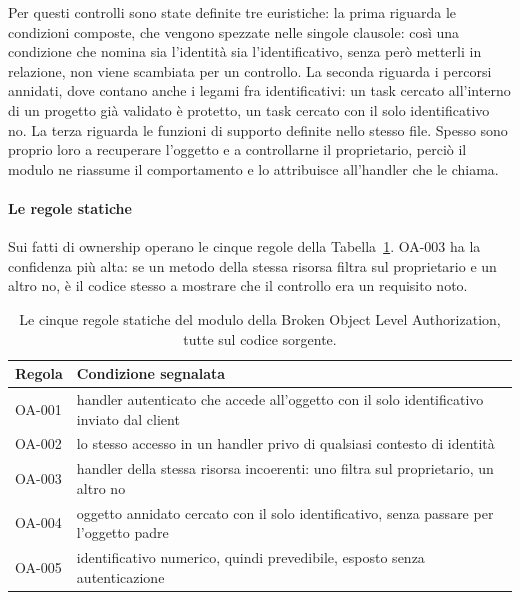 Per questi controlli sono state definite tre euristiche: la prima riguarda le
condizioni composte, che vengono spezzate nelle singole clausole: così una
condizione che nomina sia l'identità sia l'identificativo, senza però metterli
in relazione, non viene scambiata per un controllo. La seconda riguarda i
percorsi annidati, dove contano anche i legami fra identificativi: un task
cercato all'interno di un progetto già validato è protetto, un task cercato con
il solo identificativo no. La terza riguarda le funzioni di supporto definite
nello stesso file. Spesso sono proprio loro a recuperare l'oggetto e a
controllarne il proprietario, perciò il modulo ne riassume il comportamento e
lo attribuisce all'handler che le chiama.

\paragraph{Le regole statiche}
Sui fatti di ownership operano le cinque regole della
Tabella~\ref{tab:regole-bola}. OA-003 ha la confidenza più alta: se un metodo
della stessa risorsa filtra sul proprietario e un altro no, è il codice stesso
a mostrare che il controllo era un requisito noto.

\begin{table}[htbp]
  \centering
  \small
  \linespread{1.0}\selectfont
  \begin{tabularx}{\linewidth}{@{}l X@{}}
    \toprule
    \textbf{Regola} & \textbf{Condizione segnalata} \\
    \midrule
    OA-001 & handler autenticato che accede all'oggetto con il solo
    identificativo inviato dal client \\
    OA-002 & lo stesso accesso in un handler privo di qualsiasi contesto di
    identità \\
    OA-003 & handler della stessa risorsa incoerenti: uno filtra sul
    proprietario, un altro no \\
    OA-004 & oggetto annidato cercato con il solo identificativo, senza
    passare per l'oggetto padre \\
    OA-005 & identificativo numerico, quindi prevedibile, esposto senza
    autenticazione \\
    \bottomrule
  \end{tabularx}
  \caption[Regole statiche della BOLA]{Le cinque regole statiche del modulo
  della Broken Object Level Authorization, tutte sul codice sorgente.}
  \label{tab:regole-bola}
\end{table}


